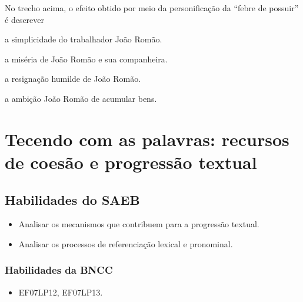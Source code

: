 No trecho acima, o efeito obtido por meio da personificação da ``febre de possuir'' é descrever

\begin{escolha}
  
  \item a simplicidade do trabalhador João Romão. 
  
  \item a miséria de João Romão e sua companheira.
  
  \item a resignação humilde de João Romão. 
  
  \item a ambição João Romão de acumular bens. 

\end{escolha}


\chapter{Tecendo com as palavras: recursos de coesão e progressão textual}

\section*{Habilidades do SAEB}

\begin{itemize}

  \item Analisar os mecanismos que contribuem para a progressão textual.

  \item Analisar os processos de referenciação lexical e pronominal.

\end{itemize}


\subsection{Habilidades da BNCC}

\begin{itemize}

  \item EF07LP12, EF07LP13.

\end{itemize}

